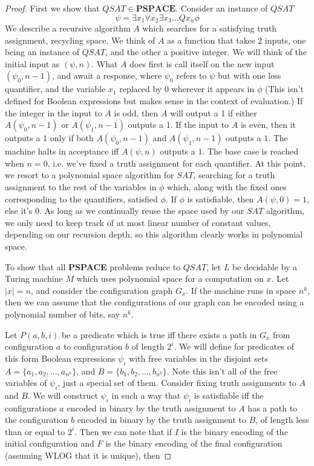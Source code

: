 \begin{proof}
    First we show that $QSAT \in \textbf{PSPACE}$. Consider an instance of $QSAT$ 
    \[\psi = \exists x_1 \forall x_2 \exists x_3 ... Q x_n \phi \]
    We describe a recursive algorithm $A$ which searches for a satisfying truth assignment, recycling space. We think of $A$ as a function that takes $2$ inputs, one being an instance of $QSAT$, and the other a positive integer. We will think of the initial input as $(\psi,n)$. What $A$ does first is call itself on the new input $(\psi_0,n-1)$, and await a response, where $\psi_0$ refers to $\psi$ but with one less quantifier, and the variable $x_1$ replaced by $0$ wherever it appears in $\phi$ (This isn't defined for Boolean expressions but makes sense in the context of evaluation.) If the integer in the input to $A$ is odd, then $A$ will output a 1 if either $A(\psi_0,n-1)$ or $A(\psi_1,n-1)$ outputs a 1. If the input to $A$ is even, then it outputs a $1$ only if both $A(\psi_0,n-1)$ and $A(\psi_1,n-1)$ outputs a $1$. The machine halts in acceptance iff $A(\psi,n)$ outputs a $1$. The base case is reached when $n=0$, i.e. we've fixed a truth assignment for each quantifier. At this point, we resort to a polynomial space algorithm for $SAT$, searching for a truth assignment to the rest of the variables in $\phi$ which, along with the fixed ones corresponding to the quantifiers, satisfied $\phi$. If $\phi$ is satisfiable, then $A(\psi,0) = 1$, else it's $0$. As long as we continually reuse the space used by our $SAT$ algorithm, we only need to keep track of at most linear number of constant values, depending on our recursion depth, so this algorithm clearly works in polynomial space.
    \par To show that all \textbf{PSPACE} problems reduce to $QSAT$, let $L$ be decidable by a Turing machine $M$ which uses polynomial space for a computation on $x$. Let $|x|=n$, and consider the configuration graph $G_x$. If the machine runs in space $n^k$, then we can assume that the configurations of our graph can be encoded using a polynomial number of bits, say $n^k$.
    \par Let $P(a,b,i)$ be a predicate which is true iff there exists a path in $G_x$ from configuration $a$ to configuration $b$ of length $2^i$. We will define for predicates of this form Boolean expressions $\psi_i$ with free variables in the disjoint sets $A = \{a_1,a_2,...,a_{n^k}\}$, and $B = \{b_1,b_2,...,b_{n^k}\}$. Note this isn't all of the free variables of $\psi_i$, just a special set of them. Consider fixing truth assignments to $A$ and $B$. We will construct $\psi_i$ in such a way that $\psi_i$ is satisfiable iff the configurations $a$ encoded in binary by the truth assignment to $A$ has a path to the configuration $b$ encoded in binary by the truth assignment to $B$, of length less than or equal to $2^i$. Then we can note that if $I$ is the binary encoding of the initial configuration and $F$ is the binary encoding of the final configuration (assuming WLOG that it is unique), then 

\end{proof}
